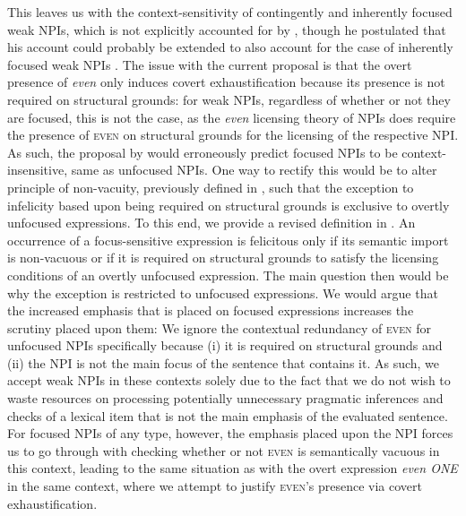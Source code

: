 This leaves us with the context-sensitivity of contingently and inherently focused weak NPIs, which is not explicitly accounted for by \textcite{Crnic2014-dogma}, though he postulated that his account could probably be extended to also account for the case of inherently focused weak NPIs \parencite[p.~143]{Crnic2014-dogma}. The issue with the current proposal is that the overt presence of \textit{even} only induces covert exhaustification because its presence is not required on structural grounds: for weak NPIs, regardless of whether or not they are focused, this is not the case, as the \textit{even} licensing theory of NPIs does require the presence of {\scshape even} on structural grounds for the licensing of the respective NPI. As such, the proposal by \textcite{Crnic2014-dogma} would erroneously predict focused NPIs to be context-insensitive, same as unfocused NPIs. One way to rectify this would be to alter  principle of non-vacuity, previously defined in , such that the exception to infelicity based upon being required on structural grounds is exclusive to overtly unfocused expressions. To this end, we provide a revised definition in .
\ex{}
{}
An occurrence of a focus-sensitive expression is felicitous only if its semantic import is non-vacuous or if it is required on structural grounds to satisfy the licensing conditions of an overtly unfocused expression.
\xe
The main question then would be why the exception is restricted to unfocused expressions. We would argue that the increased emphasis that is placed on focused expressions increases the scrutiny placed upon them: We ignore the contextual redundancy of {\scshape even} for unfocused NPIs specifically because (i) it is required on structural grounds and (ii) the NPI is not the main focus of the sentence that contains it. As such, we accept weak NPIs in these contexts solely due to the fact that we do not wish to waste resources on processing potentially unnecessary pragmatic inferences and checks of a lexical item that is not the main emphasis of the evaluated sentence. For focused NPIs of any type, however, the emphasis placed upon the NPI forces us to go through with checking whether or not {\scshape even} is semantically vacuous in this context, leading to the same situation as with the overt expression \textit{even \MakeUppercase{one}} in the same context, where we attempt to justify {\scshape even}'s presence via covert exhaustification. %

